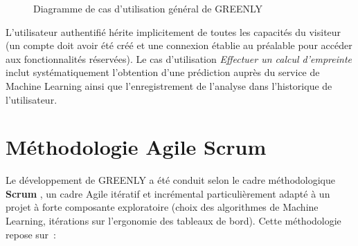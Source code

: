 \begin{figure}[H]
{
}
\caption{Diagramme de cas d'utilisation général de GREENLY}
\label{fig:use-case}
\end{figure}

L'utilisateur authentifié hérite implicitement de toutes les capacités du visiteur (un compte doit avoir été créé et une connexion établie au préalable pour accéder aux fonctionnalités réservées). Le cas d'utilisation \textit{Effectuer un calcul d'empreinte} inclut systématiquement l'obtention d'une prédiction auprès du service de Machine Learning ainsi que l'enregistrement de l'analyse dans l'historique de l'utilisateur.

\section{Méthodologie Agile Scrum}

Le développement de GREENLY a été conduit selon le cadre méthodologique \textbf{Scrum} \cite{scrumGuide}, un cadre Agile itératif et incrémental particulièrement adapté à un projet à forte composante exploratoire (choix des algorithmes de Machine Learning, itérations sur l'ergonomie des tableaux de bord). Cette méthodologie repose sur~:

